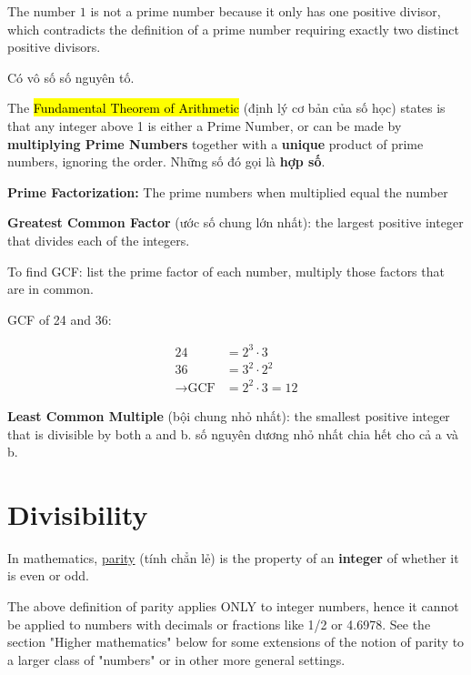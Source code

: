 The number \(\text{1}\) is not a prime number because it only has one positive divisor, which contradicts the definition of a prime number requiring exactly two distinct positive divisors. 

Có vô số số nguyên tố.

\vspace{5 mm}

The \hl{Fundamental Theorem of Arithmetic} (định lý cơ bản của số học) states is that any integer above 1 is either a Prime Number, or can be made by \textbf{multiplying Prime Numbers} together with a \textbf{unique} product of prime numbers, ignoring the order. Những số đó gọi là \textbf{hợp số}.

\textbf{Prime Factorization:} The prime numbers when multiplied equal the number

\vspace{5 mm}

\textbf{Greatest Common Factor} (ước số chung lớn nhất): the largest positive integer that divides each of the integers.

To find GCF: list the prime factor of each number, multiply those factors that are in common.

GCF of 24 and 36:

\[
  \begin{aligned}
    24 &= 2^{3} \cdot 3\\
    36 &= 3^{2} \cdot 2^{2}\\
    \rightarrow \text{GCF} &= 2^{2} \cdot 3 = 12
  \end{aligned}\]
\[\]

\textbf{Least Common Multiple} (bội chung nhỏ nhất): the smallest positive integer that is divisible by both a and b. số nguyên dương nhỏ nhất chia hết cho cả a và b.

\section{Divisibility}

In mathematics, \href{https://en.wikipedia.org/wiki/Parity_%28mathematics%29}{parity} (tính chẳn lẻ) is the property of an \textbf{integer} of whether it is even or odd.

The above definition of parity applies ONLY to integer numbers, hence it cannot be applied to numbers with decimals or fractions like 1/2 or 4.6978. See the section "Higher mathematics" below for some extensions of the notion of parity to a larger class of "numbers" or in other more general settings. 

